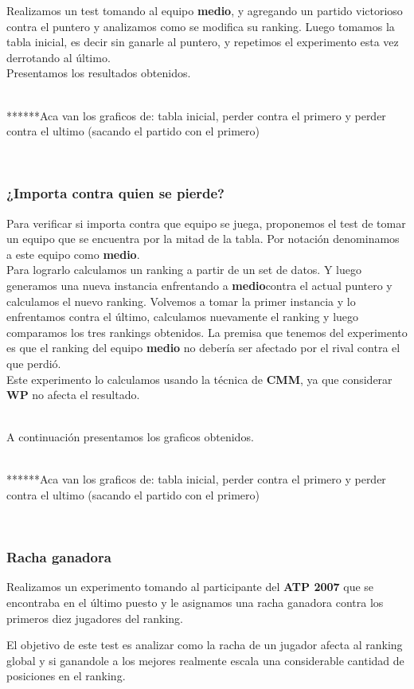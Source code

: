 Realizamos un test tomando al equipo \textbf{medio}, y agregando un partido victorioso contra el puntero y analizamos como se modifica su ranking. Luego tomamos la tabla inicial, es decir sin ganarle al puntero, y repetimos el experimento esta vez derrotando al último. \\

Presentamos los resultados obtenidos.

\\


******Aca van los graficos de: tabla inicial, perder contra el primero y perder contra el ultimo (sacando el partido con el primero)

\\




\subsubsection{¿Importa contra quien se pierde?}

Para verificar si importa contra que equipo se juega, proponemos el test de tomar un equipo que se encuentra por la mitad de la tabla. Por notación denominamos a este equipo como \textbf{medio}. \\

Para lograrlo calculamos un ranking a partir de un set de datos. Y luego generamos una nueva instancia enfrentando a \textbf{medio}contra el actual puntero y calculamos el nuevo ranking. Volvemos a tomar la primer instancia y lo enfrentamos contra el último, calculamos nuevamente el ranking y luego comparamos los tres rankings obtenidos. La premisa que tenemos del experimento es que el ranking del equipo \textbf{medio} no debería ser afectado por el rival contra el que perdió.\\

Este experimento lo calculamos usando la técnica de \textbf{CMM}, ya que considerar \textbf{WP} no afecta el resultado.

\\
A continuación presentamos los graficos obtenidos.

\\


******Aca van los graficos de: tabla inicial, perder contra el primero y perder contra el ultimo (sacando el partido con el primero)

\\



\subsubsection{Racha ganadora}

Realizamos un experimento tomando al participante del \textbf{ATP 2007} que se encontraba en el último puesto y le asignamos una racha ganadora contra los primeros diez jugadores del ranking.

El objetivo de este test es analizar como la racha de un jugador afecta al ranking global y si ganandole a los mejores realmente escala una considerable cantidad de posiciones en el ranking.



